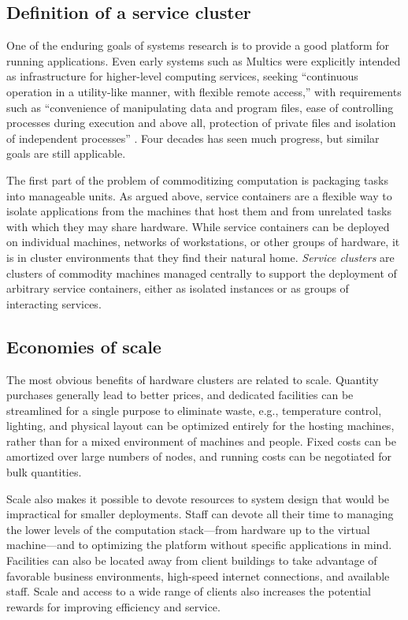 \subsection{Definition of a service cluster}

One of the enduring goals of systems research is to provide a good platform for running applications. Even early systems such as Multics were explicitly intended as infrastructure for higher-level computing services, seeking ``continuous operation in a utility-like manner, with flexible remote access,'' with requirements such as ``convenience of manipulating data and program files, ease of controlling processes during execution and above all, protection of private files and isolation of independent processes'' \cite{corbato}. Four decades has seen much progress, but similar goals are still applicable.

The first part of the problem of commoditizing computation is packaging tasks into manageable units. As argued above, service containers are a flexible way to isolate applications from the machines that host them and from unrelated tasks with which they may share hardware. While service containers can be deployed on individual machines, networks of workstations, or other groups of hardware, it is in cluster environments that they find their natural home. \emph{Service clusters} are clusters of commodity machines managed centrally to support the deployment of arbitrary service containers, either as isolated instances or as groups of interacting services.

\subsection{Economies of scale}

The most obvious benefits of hardware clusters are related to scale. Quantity purchases generally lead to better prices, and dedicated facilities can be streamlined for a single purpose to eliminate waste, e.g., temperature control, lighting, and physical layout can be optimized entirely for the hosting machines, rather than for a mixed environment of machines and people. Fixed costs can be amortized over large numbers of nodes, and running costs can be negotiated for bulk quantities.

Scale also makes it possible to devote resources to system design that would be impractical for smaller deployments. Staff can devote all their time to managing the lower levels of the computation stack---from hardware up to the virtual machine---and to optimizing the platform without specific applications in mind. Facilities can also be located away from client buildings to take advantage of favorable business environments, high-speed internet connections, and available staff. Scale and access to a wide range of clients also increases the potential rewards for improving efficiency and service.

